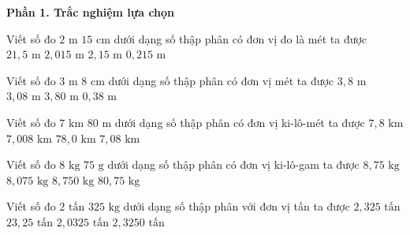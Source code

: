 \textbf{Phần 1. Trắc nghiệm lựa chọn}

\begin{ex} %
Viết số đo $2\text{ m } 15\text{ cm}$ dưới dạng số thập phân có đơn vị đo là mét ta được
\choice
{$21{,}5\text{ m}$}
{$2{,}015\text{ m}$}
{\True $2{,}15\text{ m}$}
{$0{,}215\text{ m}$}
\end{ex}

\begin{ex} %
Viết số đo $3\text{ m } 8\text{ cm}$ dưới dạng số thập phân có đơn vị mét ta được
\choice
{$3{,}8\text{ m}$}
{\True $3{,}08\text{ m}$}
{$3{,}80\text{ m}$}
{$0{,}38\text{ m}$}
\end{ex}

\begin{ex} %
Viết số đo $7\text{ km } 80\text{ m}$ dưới dạng số thập phân có đơn vị ki-lô-mét ta được
\choice
{$7{,}8\text{ km}$}
{$7{,}008\text{ km}$}
{$78{,}0\text{ km}$}
{\True $7{,}08\text{ km}$}
\end{ex}

\begin{ex} %
Viết số đo $8\text{ kg } 75\text{ g}$ dưới dạng số thập phân có đơn vị ki-lô-gam ta được
\choice
{$8{,}75\text{ kg}$}
{\True $8{,}075\text{ kg}$}
{$8{,}750\text{ kg}$}
{$80{,}75\text{ kg}$}
\end{ex}

\begin{ex} %
Viết số đo $2\text{ tấn } 325\text{ kg}$ dưới dạng số thập phân với đơn vị tấn ta được
\choice
{\True $2{,}325\text{ tấn}$}
{$23{,}25\text{ tấn}$}
{$2{,}0325\text{ tấn}$}
{$2{,}3250\text{ tấn}$}
\end{ex}

